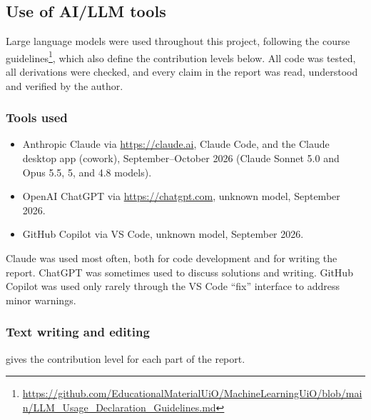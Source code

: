 \subsection{Use of AI/LLM tools}
\label{app:ai-tools}

Large language models were used throughout this project, following the course
guidelines\footnote{\url{https://github.com/EducationalMaterialUiO/MachineLearningUiO/blob/main/LLM_Usage_Declaration_Guidelines.md}},
which also define the contribution levels below. All code was tested, all
derivations were checked, and every claim in the report was read, understood
and verified by the author.

\subsubsection{Tools used}
\begin{itemize}
    \item Anthropic Claude via \url{https://claude.ai}, Claude Code, and the Claude
    desktop app (cowork), September--October 2026
    (Claude Sonnet 5.0 and Opus 5.5, 5, and 4.8 models).
    \item OpenAI ChatGPT via \url{https://chatgpt.com}, unknown model, September 2026.
    \item GitHub Copilot via VS Code, unknown model, September 2026.
\end{itemize}

Claude was used most often, both for code development and for writing the report.
ChatGPT was sometimes used to discuss solutions and writing. GitHub Copilot was
used only rarely through the VS Code ``fix'' interface to address minor warnings.

\subsubsection{Text writing and editing}
 gives the contribution level for each part
of the report.

